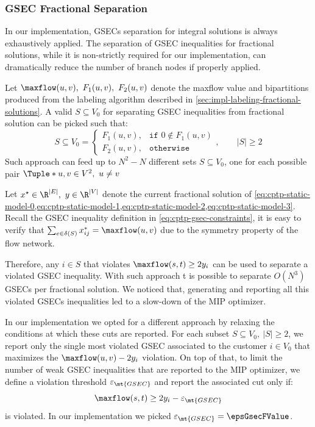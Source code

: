 \subsubsection{GSEC Fractional Separation}
\label{sec:impl-gsec-fractional-separation}

In our implementation, GSECs separation for integral solutions is always exhaustively applied.
The separation of GSEC inequalities for fractional solutions,
while it is non-strictly required for our implementation,
can dramatically reduce the number of branch nodes if properly applied.

Let $\maxflow(u, v),\ F_1(u, v),\ F_2(u, v)$ denote the maxflow value and bipartitions
produced from the labeling algorithm described in \cref{sec:impl-labeling-fractional-solutions}.
A valid $S \subseteq V_0$ for separating GSEC inequalities from fractional solution can be picked such that:
\begin{equation}
	S \subseteq V_0 =
	\begin{cases}
		F_1(u, v), & \texttt{if } 0 \notin F_1(u, v) \\
		F_2(u, v), & \texttt{otherwise}
	\end{cases},
	\qquad
	|S| \ge 2
\end{equation}
Such approach can feed up to
$N^2 - N$ different sets $S \subseteq V_0$,
one for each possible pair $\Tuple*{u, v} \in V^2,\ u \ne v$


Let $x^\star \in \R^{|E|},\ y \in \R^{|V|}$ denote the
current fractional solution of
\cref{eq:cptp-static-model-0,eq:cptp-static-model-1,eq:cptp-static-model-2,eq:cptp-static-model-3}.
Recall the GSEC inequality definition in \cref{eq:cptp-gsec-constraints},
it is easy to verify that $\sum_{e \in \delta(S)} x^*_{ij} = \maxflow(u, v)$
due to the symmetry property of the flow network.

Therefore, any $i \in S$ that violates $\maxflow(s, t) \ge 2 y_i$
can be used to separate a violated GSEC inequality.
With such approach t is possible to separate $O(N^3)$ GSECs per fractional solution.
We noticed that, generating and reporting all this violated GSECs inequalities
led to a slow-down of the MIP optimizer.

\medskip
In our implementation we opted for a different approach by relaxing the conditions at which these cuts are reported.
For each subset $S \subseteq V_0,\ |S| \ge 2$, we report only the single most violated GSEC
associated to the customer $i \in V_0$ that maximizes the $\maxflow(u, v) - 2 y_i$ violation.
On top of that, to limit the number of weak GSEC inequalities that are reported to the MIP optimizer,
we define a violation threshold $\varepsilon_{\mt{GSEC}}$ and report the associated cut only if:
\begin{equation}
	\maxflow(s, t) \ge 2 y_i - \varepsilon_{\mt{GSEC}}
\end{equation}
is violated.
In our implementation we picked $\varepsilon_{\mt{GSEC}} = \epsGsecFValue$.

